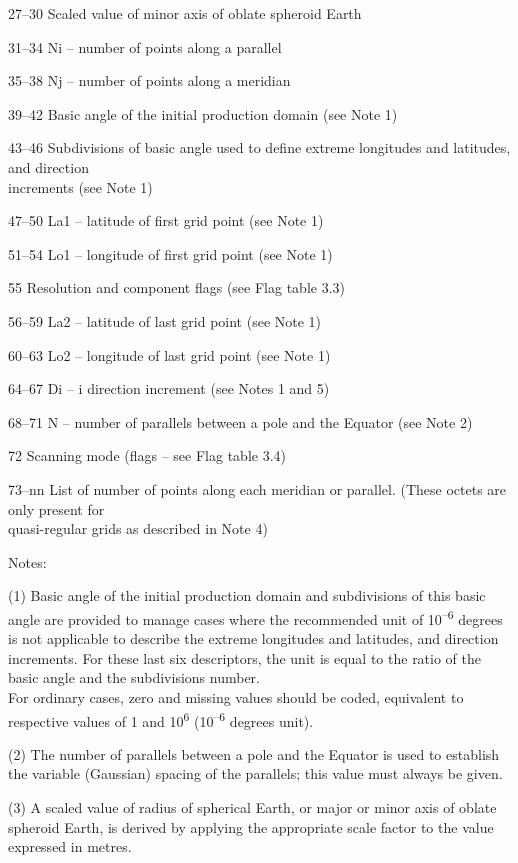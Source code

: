 27--30 Scaled value of minor axis of oblate spheroid Earth

31--34 Ni -- number of points along a parallel

35--38 Nj -- number of points along a meridian

39--42 Basic angle of the initial production domain (see Note 1)

43--46 Subdivisions of basic angle used to define extreme longitudes and latitudes, and direction\\
increments (see Note 1)

47--50 La1 -- latitude of first grid point (see Note 1)

51--54 Lo1 -- longitude of first grid point (see Note 1)

55 Resolution and component flags (see Flag table 3.3)

56--59 La2 -- latitude of last grid point (see Note 1)

60--63 Lo2 -- longitude of last grid point (see Note 1)

64--67 Di -- i direction increment (see Notes 1 and 5)

68--71 N -- number of parallels between a pole and the Equator (see Note 2)

72 Scanning mode (flags -- see Flag table 3.4)

73--nn List of number of points along each meridian or parallel. (These octets are only present for\\
quasi-regular grids as described in Note 4)

Notes:

(1) Basic angle of the initial production domain and subdivisions of this basic angle are provided to manage cases where the recommended unit of 10\textsuperscript{--6} degrees is not applicable to describe the extreme longitudes and latitudes, and direction increments. For these last six descriptors, the unit is equal to the ratio of the basic angle and the subdivisions number.\\
For ordinary cases, zero and missing values should be coded, equivalent to respective values of 1 and 10\textsuperscript{6} (10\textsuperscript{--6} degrees unit).

(2) The number of parallels between a pole and the Equator is used to establish the variable (Gaussian) spacing of the parallels; this value must always be given.

(3) A scaled value of radius of spherical Earth, or major or minor axis of oblate spheroid Earth, is derived by applying the appropriate scale factor to the value expressed in metres.


